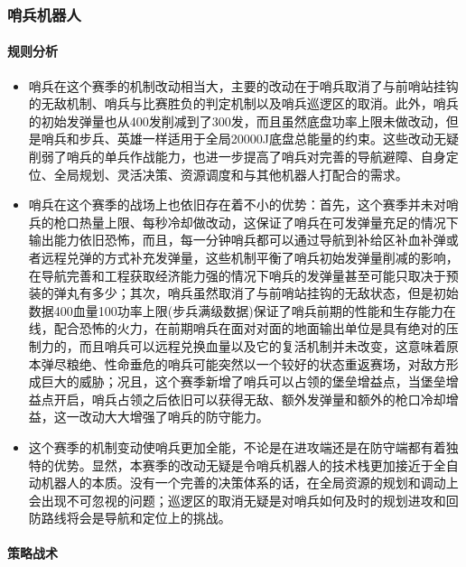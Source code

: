 \subsubsection{哨兵机器人}

    \paragraph{规则分析}


        \begin{itemize}
            \item 哨兵在这个赛季的机制改动相当大，主要的改动在于哨兵取消了与前哨站挂钩的无敌机制、哨兵与比赛胜负的判定机制以及哨兵巡逻区的取消。此外，哨兵的初始发弹量也从400发削减到了300发，而且虽然底盘功率上限未做改动，但是哨兵和步兵、英雄一样适用于全局20000J底盘总能量的约束。这些改动无疑削弱了哨兵的单兵作战能力，也进一步提高了哨兵对完善的导航避障、自身定位、全局规划、灵活决策、资源调度和与其他机器人打配合的需求。
            \item 哨兵在这个赛季的战场上也依旧存在着不小的优势：首先，这个赛季并未对哨兵的枪口热量上限、每秒冷却做改动，这保证了哨兵在可发弹量充足的情况下输出能力依旧恐怖，而且，每一分钟哨兵都可以通过导航到补给区补血补弹或者远程兑弹的方式补充发弹量，这些机制平衡了哨兵初始发弹量削减的影响，在导航完善和工程获取经济能力强的情况下哨兵的发弹量甚至可能只取决于预装的弹丸有多少；其次，哨兵虽然取消了与前哨站挂钩的无敌状态，但是初始数据400血量100功率上限(步兵满级数据)保证了哨兵前期的性能和生存能力在线，配合恐怖的火力，在前期哨兵在面对对面的地面输出单位是具有绝对的压制力的，而且哨兵可以远程兑换血量以及它的复活机制并未改变，这意味着原本弹尽粮绝、性命垂危的哨兵可能突然以一个较好的状态重返赛场，对敌方形成巨大的威胁；况且，这个赛季新增了哨兵可以占领的堡垒增益点，当堡垒增益点开启，哨兵占领之后依旧可以获得无敌、额外发弹量和额外的枪口冷却增益，这一改动大大增强了哨兵的防守能力。
            \item 这个赛季的机制变动使哨兵更加全能，不论是在进攻端还是在防守端都有着独特的优势。显然，本赛季的改动无疑是令哨兵机器人的技术栈更加接近于全自动机器人的本质。没有一个完善的决策体系的话，在全局资源的规划和调动上会出现不可忽视的问题；巡逻区的取消无疑是对哨兵如何及时的规划进攻和回防路线将会是导航和定位上的挑战。
        \end{itemize}
    
    \paragraph{策略战术}

